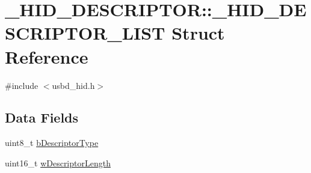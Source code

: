 \hypertarget{struct__HID__DESCRIPTOR_1_1__HID__DESCRIPTOR__LIST}{\section{\-\_\-\-H\-I\-D\-\_\-\-D\-E\-S\-C\-R\-I\-P\-T\-O\-R\-:\-:\-\_\-\-H\-I\-D\-\_\-\-D\-E\-S\-C\-R\-I\-P\-T\-O\-R\-\_\-\-L\-I\-S\-T Struct Reference}
\label{struct__HID__DESCRIPTOR_1_1__HID__DESCRIPTOR__LIST}
}


{\ttfamily \#include $<$usbd\-\_\-hid.\-h$>$}

\subsection*{Data Fields}
\begin{DoxyCompactItemize}
\item 
uint8\-\_\-t \hyperlink{struct__HID__DESCRIPTOR_1_1__HID__DESCRIPTOR__LIST_af5a02f1ba9ad4951dc9d5548f5f3eeef}{b\-Descriptor\-Type}
\item 
uint16\-\_\-t \hyperlink{struct__HID__DESCRIPTOR_1_1__HID__DESCRIPTOR__LIST_ad367e538b51883805ae462a047546ee7}{w\-Descriptor\-Length}
\end{DoxyCompactItemize}


